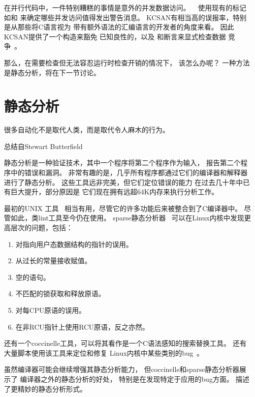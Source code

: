 在并行代码中，一件特别糟糕的事情是意外的并发数据访问。
~\cite{JonathanCorbet2019KCSAN}
使用现有的标记如和
来确定哪些并发访问值得发出警告消息。
KCSAN有相当高的误报率，特别是从那些将C语言视为
带有额外语法的汇编语言的开发者的角度来看。
因此KCSAN提供了一个构造来豁免
已知良性的，以及
和断言来显式检查数据
竞争~\cite{MarcoElver2020FearDataRaceDetector1,MarcoElver2020FearDataRaceDetector2}。

那么，在需要检查但无法容忍运行时检查开销的情况下，
该怎么办呢？
一种方法是静态分析，将在下一节讨论。

\section{静态分析}
\label{sec:debugging:Static Analysis}
%
\epigraph{很多自动化不是取代人类，而是取代令人麻木的行为。}
	 {总结自Stewart Butterfield}

静态分析是一种验证技术，其中一个程序将第二个程序作为输入，
报告第二个程序中的错误和漏洞。
非常有趣的是，几乎所有程序都通过它们的编译器和解释器进行了静态分析。
这些工具远非完美，但它们定位错误的能力
在过去几十年中已有巨大提升，部分原因是
它们现在拥有远超64K内存来执行分析工作。

最初的UNIX 工具~\cite{StephenJohnson1977lint}
相当有用，尽管它的许多功能后来被整合到了C编译器中。
尽管如此，类lint工具至今仍在使用。
sparse静态分析器~\cite{JonathanCorbet2004sparse}
可以在Linux内核中发现更高层次的问题，包括：

\begin{enumerate}
\item	对指向用户态数据结构的指针的误用。
\item	从过长的常量接收赋值。
\item	空的语句。
\item	不匹配的锁获取和释放原语。
\item	对每CPU原语的误用。
\item	在非RCU指针上使用RCU原语，反之亦然。
\end{enumerate}

还有一个coccinelle工具，可以将其看作是一个C语法感知的搜索替换工具。
还有大量脚本使用该工具来定位和修复
Linux内核中某些类别的bug~\cite{NicolasPalix2011CoccinelleTenYears}。

虽然编译器可能会继续增强其静态分析能力，
但coccinelle和sparse静态分析器展示了
编译器之外的静态分析的好处，
特别是在发现特定于应用的bug方面。
描述了更精妙的静态分析形式。

